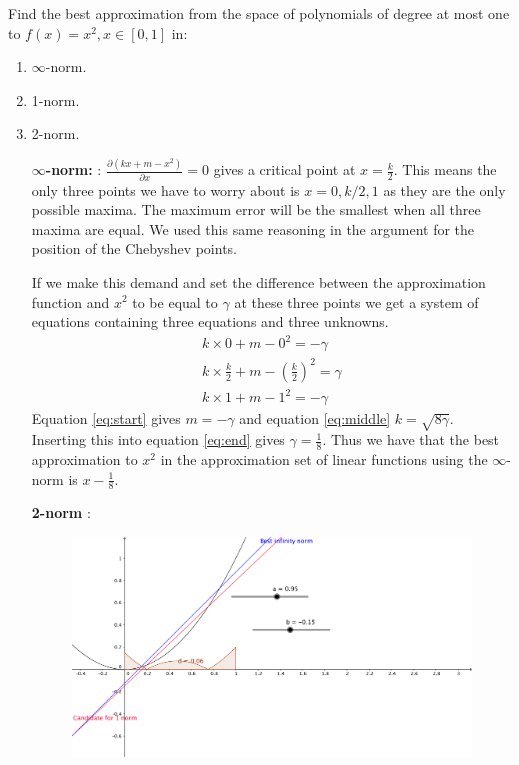 \begin{problem}
Find the best approximation from the space of polynomials of degree at
most one to $f(x) = x^2 , x \in [0 , 1]$ in:
\begin{enumerate}
\item $\infty$-norm.
\item 1-norm.
\item 2-norm.
\end{enumerate}
\end{problem}

\begin{solution}
  \begin{enumerate}
  \item [{\bf $\infty$-norm: }]:
    $\frac{\partial (kx + m - x^2)}{\partial x} = 0$ gives a critical
    point at $x = \frac{k}{2}$. This means the only three points we
    have to worry about is $x = 0, k/2, 1$ as they are the only
    possible maxima. The maximum error will be the smallest when all
    three maxima are equal. We used this same reasoning in the
    argument for the position of the Chebyshev points.

    If we make this demand and set the difference between the
    approximation function and $x^2$ to be equal to $\gamma$ at these
    three points we get a system of equations containing three
    equations and three unknowns.
    \begin{align}
      k \times 0  + m  - 0^2  = -\gamma \label{eq:start}\\
      k \times \frac{k}{2}  + m - \left(\frac{k}{2}\right)^2  = \gamma
      \label{eq:middle}\\
      k \times 1  + m  - 1^2   = -\gamma \label{eq:end}
    \end{align}
    Equation \ref{eq:start} gives $m = - \gamma$ and equation
    \ref{eq:middle} $k = \sqrt{8\gamma}$. Inserting this into equation
    \ref{eq:end} gives $\gamma = \frac{1}{8}$. Thus we have that the
    best approximation to $x^2$ in the approximation set of linear
    functions using the $\infty$-norm is $x - \frac{1}{8}$.
    
  \item [{\bf 2-norm}]:
    \begin{figure}[!ht]
      \centering
      \includegraphics[scale = 0.2]{task7.png}
      \label{fig:task_7}
    \end{figure}

  \end{enumerate}
\end{solution}

 	

